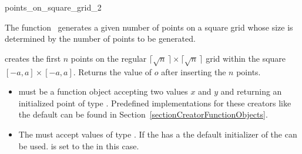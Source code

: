 \begin{ccRefFunction}{points_on_square_grid_2}

\ccDefinition

The function \ccRefName\ generates a given number of points on a square
grid whose size is determined by the number of points to be generated.


\def\ccLongParamLayout{\ccTrue}
{ creates the first $n$ points on the regular $\lceil\sqrt{n}\,\rceil
    \times \lceil  \sqrt{n}\,\rceil$ grid within the square
    $[-a,a]\times [-a,a]$. Returns the value of $o$ after inserting
    the $n$ points. 
}
\def\ccLongParamLayout{\ccFalse}

\ccRequirements

\begin{itemize}
   \item {} must be a function object accepting two
          values $x$ and $y$ and returning an initialized point
          of type . Predefined implementations for these
         creators like the default can be found in
         Section~\ref{sectionCreatorFunctionObjects}. 
   \item The  must accept values of type . If the
          has a  the default
         initializer of the  can be used.  is set to
         the  in this case.
\end{itemize}

\ccSeeAlso


 \\
 \\
 \\
 \\
 \\
 \\

\end{ccRefFunction}
